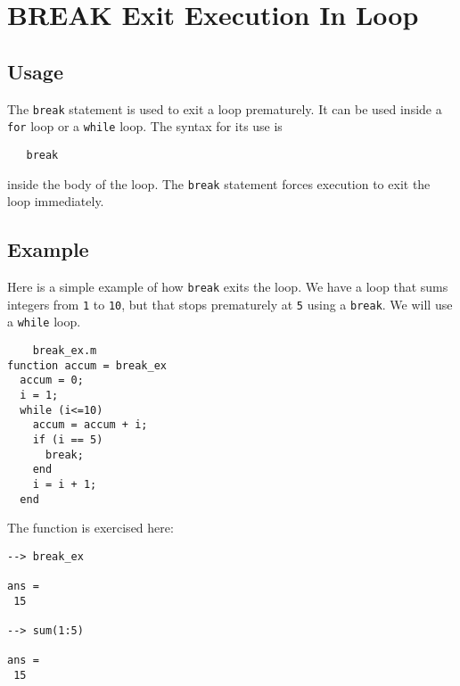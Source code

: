 \section{BREAK Exit Execution In Loop}

\subsection{Usage}

The \verb|break| statement is used to exit a loop prematurely.
It can be used inside a \verb|for| loop or a \verb|while| loop.  The
syntax for its use is
\begin{verbatim}
   break
\end{verbatim}
inside the body of the loop.  The \verb|break| statement forces
execution to exit the loop immediately.
\subsection{Example}

Here is a simple example of how \verb|break| exits the loop.
We have a loop that sums integers from \verb|1| to \verb|10|, but
that stops prematurely at \verb|5| using a \verb|break|.  We will
use a \verb|while| loop.
\begin{verbatim}
    break_ex.m
function accum = break_ex
  accum = 0;
  i = 1;
  while (i<=10) 
    accum = accum + i;
    if (i == 5)
      break;
    end
    i = i + 1;
  end
\end{verbatim}
The function is exercised here:
\begin{verbatim}
--> break_ex

ans = 
 15 

--> sum(1:5)

ans = 
 15 
\end{verbatim}
